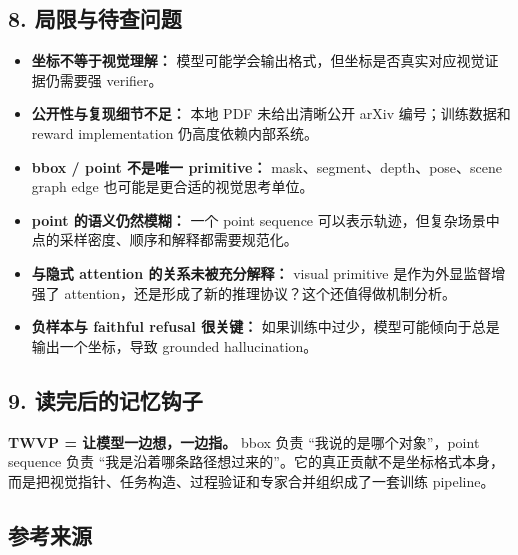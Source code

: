 \subsection{8. 局限与待查问题}

\begin{itemize}[leftmargin=1.5em]
  \item \textbf{坐标不等于视觉理解：} 模型可能学会输出格式，但坐标是否真实对应视觉证据仍需要强 verifier。
  \item \textbf{公开性与复现细节不足：} 本地 PDF 未给出清晰公开 arXiv 编号；训练数据和 reward implementation 仍高度依赖内部系统。
  \item \textbf{bbox / point 不是唯一 primitive：} mask、segment、depth、pose、scene graph edge 也可能是更合适的视觉思考单位。
  \item \textbf{point 的语义仍然模糊：} 一个 point sequence 可以表示轨迹，但复杂场景中点的采样密度、顺序和解释都需要规范化。
  \item \textbf{与隐式 attention 的关系未被充分解释：} visual primitive 是作为外显监督增强了 attention，还是形成了新的推理协议？这个还值得做机制分析。
  \item \textbf{负样本与 faithful refusal 很关键：} 如果训练中过少，模型可能倾向于总是输出一个坐标，导致 grounded hallucination。
\end{itemize}

\subsection{9. 读完后的记忆钩子}

\begin{summarybox}
\textbf{TWVP = 让模型一边想，一边指。} bbox 负责 ``我说的是哪个对象''，point sequence 负责 ``我是沿着哪条路径想过来的''。它的真正贡献不是坐标格式本身，而是把视觉指针、任务构造、过程验证和专家合并组织成了一套训练 pipeline。
\end{summarybox}

\subsection{参考来源}


